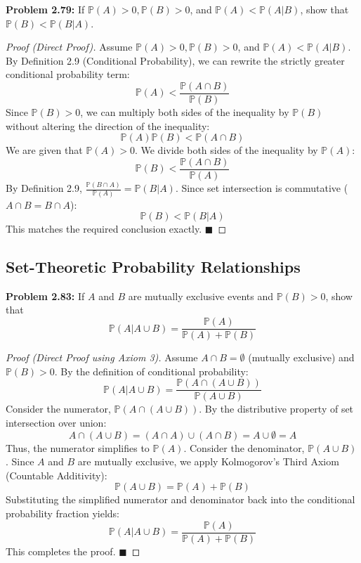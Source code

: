 \documentclass[12pt]{article}
\theoremstyle{definition}
\theoremstyle{remark}
\begin{document}
\textbf{Problem 2.79:} If $\mathbb{P}(A) > 0, \mathbb{P}(B) > 0$, and $\mathbb{P}(A) < \mathbb{P}(A|B)$, show that $\mathbb{P}(B) < \mathbb{P}(B|A)$.
\begin{proof}[Proof (Direct Proof)]
Assume $\mathbb{P}(A) > 0, \mathbb{P}(B) > 0$, and $\mathbb{P}(A) < \mathbb{P}(A|B)$.
By Definition 2.9 (Conditional Probability), we can rewrite the strictly greater conditional probability term:
\[ \mathbb{P}(A) < \frac{\mathbb{P}(A \cap B)}{\mathbb{P}(B)} \]
Since $\mathbb{P}(B) > 0$, we can multiply both sides of the inequality by $\mathbb{P}(B)$ without altering the direction of the inequality:
\[ \mathbb{P}(A)\mathbb{P}(B) < \mathbb{P}(A \cap B) \]
We are given that $\mathbb{P}(A) > 0$. We divide both sides of the inequality by $\mathbb{P}(A)$:
\[ \mathbb{P}(B) < \frac{\mathbb{P}(A \cap B)}{\mathbb{P}(A)} \]
By Definition 2.9, $\frac{\mathbb{P}(B \cap A)}{\mathbb{P}(A)} = \mathbb{P}(B|A)$. Since set intersection is commutative ($A \cap B = B \cap A$):
\[ \mathbb{P}(B) < \mathbb{P}(B|A) \]
This matches the required conclusion exactly. $\blacksquare$
\end{proof}

\subsection{Set-Theoretic Probability Relationships}

\textbf{Problem 2.83:} If $A$ and $B$ are mutually exclusive events and $\mathbb{P}(B) > 0$, show that 
\[ \mathbb{P}(A | A \cup B) = \frac{\mathbb{P}(A)}{\mathbb{P}(A) + \mathbb{P}(B)} \]
\begin{proof}[Proof (Direct Proof using Axiom 3)]
Assume $A \cap B = \emptyset$ (mutually exclusive) and $\mathbb{P}(B) > 0$. 
By the definition of conditional probability:
\[ \mathbb{P}(A | A \cup B) = \frac{\mathbb{P}(A \cap (A \cup B))}{\mathbb{P}(A \cup B)} \]
Consider the numerator, $\mathbb{P}(A \cap (A \cup B))$. By the distributive property of set intersection over union:
\[ A \cap (A \cup B) = (A \cap A) \cup (A \cap B) = A \cup \emptyset = A \]
Thus, the numerator simplifies to $\mathbb{P}(A)$.
Consider the denominator, $\mathbb{P}(A \cup B)$. Since $A$ and $B$ are mutually exclusive, we apply Kolmogorov's Third Axiom (Countable Additivity):
\[ \mathbb{P}(A \cup B) = \mathbb{P}(A) + \mathbb{P}(B) \]
Substituting the simplified numerator and denominator back into the conditional probability fraction yields:
\[ \mathbb{P}(A | A \cup B) = \frac{\mathbb{P}(A)}{\mathbb{P}(A) + \mathbb{P}(B)} \]
This completes the proof. $\blacksquare$
\end{proof}
\end{document}
